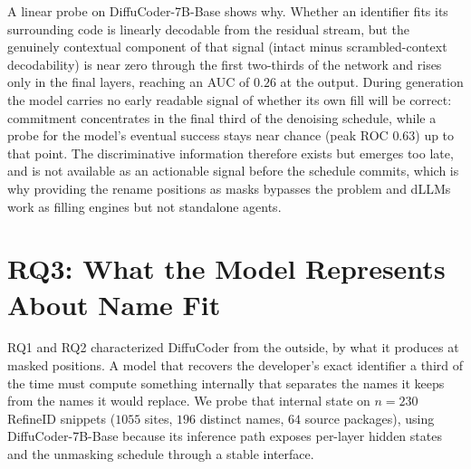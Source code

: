 

%
A linear probe on DiffuCoder-7B-Base shows why. Whether an identifier fits its
surrounding code is linearly decodable from the residual stream, but the
genuinely contextual component of that signal (intact minus scrambled-context
decodability) is near zero through the first two-thirds of the network and rises
only in the final layers, reaching an AUC of $0.26$ at the output. During
generation the model carries no early readable signal of whether its own fill
will be correct: commitment concentrates in the final third of the denoising
schedule, while a probe for the model's eventual success stays near chance
(peak ROC $0.63$) up to that point. The discriminative information therefore
exists but emerges too late, and is not available as an actionable signal before
the schedule commits, which is why providing the rename positions as masks
bypasses the problem and dLLMs work as filling engines but not standalone agents.


\section{RQ3: What the Model Represents About Name Fit}
\label{sec:rq3}
RQ1 and RQ2 characterized DiffuCoder from the outside, by what it produces at
masked positions. A model that recovers the developer's exact identifier a third
of the time must compute something internally that separates the names it keeps
from the names it would replace. We probe that internal state on $n=230$ RefineID
snippets ($1055$ sites, $196$ distinct names, $64$ source packages), using
DiffuCoder-7B-Base because its inference path exposes per-layer hidden states and
the unmasking schedule through a stable interface.

